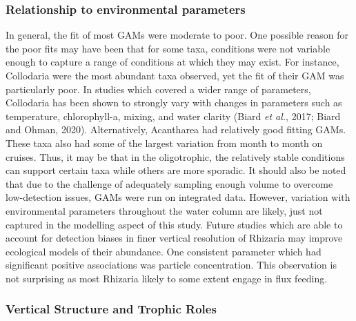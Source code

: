 \documentclass[
]{article}
\begin{document}
\subsubsection{Relationship to environmental
parameters}\label{relationship-to-environmental-parameters}

In general, the fit of most GAMs were moderate to poor. One possible
reason for the poor fits may have been that for some taxa, conditions
were not variable enough to capture a range of conditions at which they
may exist. For instance, Collodaria were the most abundant taxa
observed, yet the fit of their GAM was particularly poor. In studies
which covered a wider range of parameters, Collodaria has been shown to
strongly vary with changes in parameters such as temperature,
chlorophyll-a, mixing, and water clarity (Biard \emph{et al.}, 2017;
Biard and Ohman, 2020). Alternatively, Acantharea had relatively good
fitting GAMs. These taxa also had some of the largest variation from
month to month on cruises. Thus, it may be that in the oligotrophic, the
relatively stable conditions can support certain taxa while others are
more sporadic. It should also be noted that due to the challenge of
adequately sampling enough volume to overcome low-detection issues, GAMs
were run on integrated data. However, variation with environmental
parameters throughout the water column are likely, just not captured in
the modelling aspect of this study. Future studies which are able to
account for detection biases in finer vertical resolution of Rhizaria
may improve ecological models of their abundance. One consistent
parameter which had significant positive associations was particle
concentration. This observation is not surprising as most Rhizaria
likely to some extent engage in flux feeding.

\subsubsection{Vertical Structure and Trophic
Roles}\label{vertical-structure-and-trophic-roles}
\end{document}
